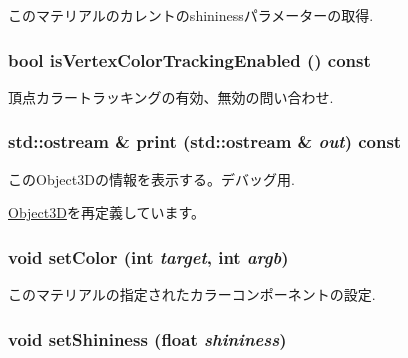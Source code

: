 このマテリアルのカレントのshininessパラメーターの取得. \hypertarget{classm3g_1_1Material_64fb5d60325fd073ab623d0eb04189d1}{
\subsubsection[{isVertexColorTrackingEnabled}]{\setlength{\rightskip}{0pt plus 5cm}bool isVertexColorTrackingEnabled () const}}
\label{classm3g_1_1Material_64fb5d60325fd073ab623d0eb04189d1}


頂点カラートラッキングの有効、無効の問い合わせ. \hypertarget{classm3g_1_1Material_6fea17fa1532df3794f8cb39cb4f911f}{
\subsubsection[{print}]{\setlength{\rightskip}{0pt plus 5cm}std::ostream \& print (std::ostream \& {\em out}) const}}
\label{classm3g_1_1Material_6fea17fa1532df3794f8cb39cb4f911f}


このObject3Dの情報を表示する。デバッグ用. 

\hyperlink{classm3g_1_1Object3D_6fea17fa1532df3794f8cb39cb4f911f}{Object3D}を再定義しています。\hypertarget{classm3g_1_1Material_5947a525a18bca77aa890971df2ae48a}{
\subsubsection[{setColor}]{\setlength{\rightskip}{0pt plus 5cm}void setColor (int {\em target}, \/  int {\em argb})}}
\label{classm3g_1_1Material_5947a525a18bca77aa890971df2ae48a}


このマテリアルの指定されたカラーコンポーネントの設定. \hypertarget{classm3g_1_1Material_fb630e98bef48acb3b3c0541ed3615be}{
\subsubsection[{setShininess}]{\setlength{\rightskip}{0pt plus 5cm}void setShininess (float {\em shininess})}}
\label{classm3g_1_1Material_fb630e98bef48acb3b3c0541ed3615be}


